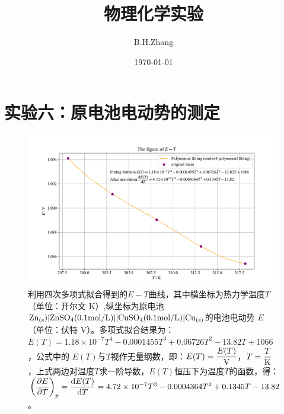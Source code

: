 \documentclass[UTF8,AutoFakeBold,a4paper]{article}
\title{\textbf{物理化学实验}}
\date{\today}
\author{B.H.Zhang}
\begin{document}
	\maketitle
	\section{}
	\section{}
	\section{}
	\section{}
	\section{}
	
	\section{实验六：原电池电动势的测定}
	\begin{figure}[h]
	\centering
	\includegraphics[scale=0.63]{6}
	\caption{利用四次多项式拟合得到的$E-T$曲线，其中横坐标为热力学温度$T$（单位：开尔文 K）,纵坐标为原电池$\ce{Zn}_{(\rm{s}})|\ce{ZnSO4}(0.1\rm{mol}/L)||\ce{CuSO4}(0.1\rm{mol/L})|\ce{Cu}_{(\rm{s})}$的电池电动势 $E$（单位：伏特 V）。多项式拟合结果为：\textcolor[rgb]{0.54,0.13,0.33}{$E(T) =1.18\times 10^{-7} T^{4} - 0.0001455 T^{3} + 0.06726 T^{2} - 13.82 T + 1066$}，公式中的 $E(T)$与$T$视作无量纲数，即：$E(T) = \dfrac{E(T)}{\ce{V}}$，$T = \dfrac{T}{\ce{K}}$，上式两边对温度$T$求一阶导数，$E(T)$恒压下为温度$T$的函数，得：\textcolor[rgb]{0.54,0.13,0.33}{$\pqty{\dfrac{\partial E}{\partial T}}_{p} = \dfrac{{\rm{d}}E(T)}{{\rm{d}}T} = 4.72\times 10^{-7} T^{3} - 0.0004364 T^{2} + 0.1345 T - 13.82$}。}
	\label{fi1}
\end{figure}
\newpage
\end{document}
